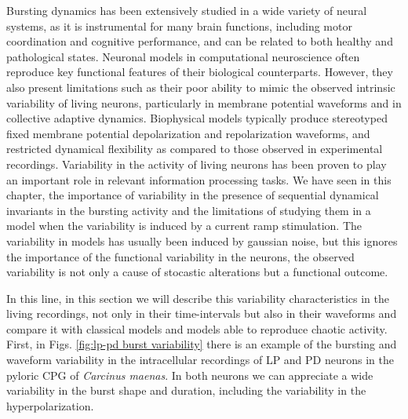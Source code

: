 Bursting dynamics has been extensively studied in a wide variety of neural systems, as it is instrumental for many brain functions, including motor coordination and cognitive performance, and can be related to both healthy and pathological states. Neuronal models in computational neuroscience often reproduce key functional features of their biological counterparts. However, they also present limitations such as their poor ability to mimic the observed intrinsic variability of living neurons, particularly in membrane potential waveforms and in collective adaptive dynamics. Biophysical models typically produce stereotyped fixed membrane potential depolarization and repolarization waveforms, and restricted dynamical flexibility as compared to those observed in experimental recordings. Variability in the activity of living neurons has been proven to play an important role in relevant information processing tasks. We have seen in this chapter, the importance of variability in the presence of sequential dynamical invariants in the bursting activity and the limitations of studying them in a model when the variability is induced by a current ramp stimulation. The variability in models has usually been induced by gaussian noise, but this ignores the importance of the functional variability in the neurons, the observed variability is not only a cause of stocastic alterations but a functional outcome. 

In this line, in this section we will describe this variability characteristics in the living recordings, not only in their time-intervals but also in their waveforms and compare it with classical models and models able to reproduce chaotic activity. 
First, in Figs. \ref{fig:lp-pd burst variability} there is an example of the bursting and waveform variability in the intracellular recordings of LP and PD neurons in the pyloric CPG of \textit{Carcinus maenas}. In both neurons we can appreciate a wide variability in the burst shape and duration, including the variability in the hyperpolarization.


